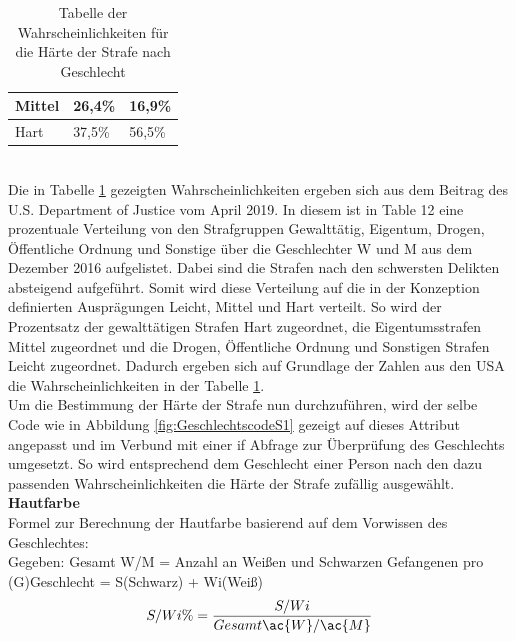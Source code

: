 \begin{onehalfspace}
\begin{table}[h]
\begin{tabular}{|l|l|l|}
    Mittel                & 26,4\%            & 16,9\%            \\ \hline
    Hart                  & 37,5\%            & 56,5\%            \\ \hline
    \end{tabular}
\caption{Tabelle der Wahrscheinlichkeiten für die Härte der Strafe nach Geschlecht}
\label{table:4}
\end{table}\\
Die in Tabelle \ref{table:4} gezeigten Wahrscheinlichkeiten ergeben sich aus dem Beitrag des U.S. Department of Justice vom April 2019. In diesem ist in \glqq{}Table 12\grqq{} eine prozentuale Verteilung von den Strafgruppen Gewalttätig, Eigentum, Drogen, Öffentliche Ordnung und Sonstige über die Geschlechter \ac{W} und \ac{M} aus dem Dezember 2016 aufgelistet. Dabei sind die Strafen nach den schwersten Delikten absteigend aufgeführt. Somit wird diese Verteilung auf die in der Konzeption definierten Ausprägungen Leicht, Mittel und Hart verteilt. So wird der Prozentsatz der gewalttätigen Strafen Hart zugeordnet, die Eigentumsstrafen Mittel zugeordnet und die Drogen, Öffentliche Ordnung und Sonstigen Strafen Leicht zugeordnet. Dadurch ergeben sich auf Grundlage der Zahlen aus den USA die Wahrscheinlichkeiten in der Tabelle \ref{table:4}.\cite[S. 21]{Prisoners}\\
Um die Bestimmung der Härte der Strafe nun durchzuführen, wird der selbe Code wie in Abbildung \ref{fig:GeschlechtscodeS1} gezeigt auf dieses Attribut angepasst und im Verbund mit einer if Abfrage zur Überprüfung des Geschlechts umgesetzt. So wird entsprechend dem Geschlecht einer Person nach den dazu passenden Wahrscheinlichkeiten die Härte der Strafe zufällig ausgewählt.\\
\textbf{Hautfarbe}\\
Formel zur Berechnung der Hautfarbe basierend auf dem Vorwissen des Geschlechtes:\\
Gegeben: Gesamt \ac{W}/\ac{M} = Anzahl an Weißen und Schwarzen Gefangenen pro (G)Geschlecht = S(Schwarz) + Wi(Weiß)\\
\begin{equation}
    S/Wi\% = \frac{S/Wi}{Gesamt \ac{W}/\ac{M}}\label{eq:Sz1Hautfarbe}
\end{equation}


\end{onehalfspace}
